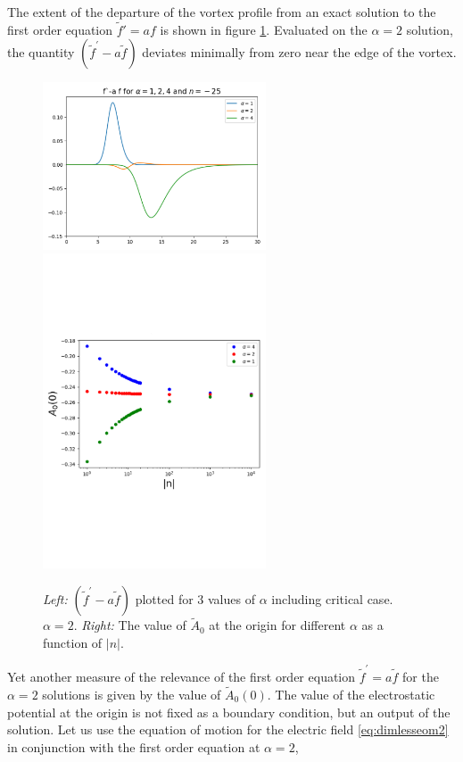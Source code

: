 The extent of the departure of the vortex profile from an exact solution to the  first order equation $\tilde f'=a f$ is shown in figure \ref{fig:error}.  Evaluated on the $\alpha=2$ solution, the quantity $(\tilde f^\prime - a \tilde f)$ deviates minimally from zero near the edge of the vortex.
\begin{figure}[H]
\begin{center}
    \includegraphics[width=2.6in]{Chapter_2_Folder_1912.11321/figures/BPS_equation_error.pdf}\qquad\includegraphics[width=2.6in]{Chapter_2_Folder_1912.11321/figures/negative_n_A0.pdf}
     \caption[\textcolor{red}{Plots of $\tilde{f}(r)' - a(r) \tilde{f}(r)$ for 3 values of $\alpha$ and $\tilde{A}_0(0)$ for different values of $|n|$ and $\alpha$.}]{{\small {\it Left: }$\left(\tilde f^\prime - a \tilde f\right)$ plotted for 3 values of $\alpha$ including critical case. $\alpha=2$. {\it Right:} The value of $\tilde A_0$ at the origin for different $\alpha$ as a function of $|n|$. }} \label{fig:error}
    \end{center}
\end{figure}
Yet another measure of the relevance of the first order equation $\tilde f^\prime = a \tilde f$ for the $\alpha=2$ solutions is given by the value of $\tilde A_0(0)$. The value of the electrostatic potential at the origin is not fixed as a boundary condition, but an output of the solution. Let us use the equation of motion for the electric field \eqref{eq:dimlesseom2} in conjunction with the first order equation at $\alpha=2$,
